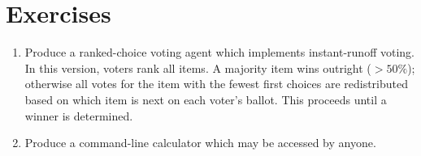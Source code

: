 \section{Exercises}

\begin{enumerate}
  \item  Produce a ranked-choice voting agent which implements instant-runoff voting.  In this version, voters rank all items.  A majority item wins outright ($>50\%$); otherwise all votes for the item with the fewest first choices are redistributed based on which item is next on each voter's ballot.  This proceeds until a winner is determined.
  \item  Produce a command-line calculator which may be accessed by anyone.
\end{enumerate}
